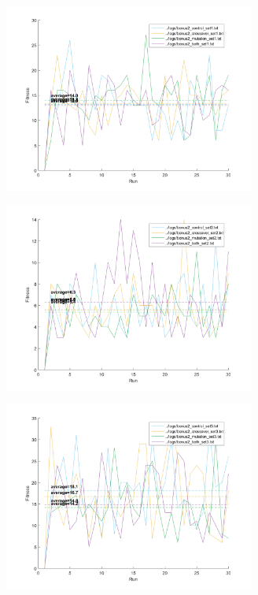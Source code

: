 \documentclass[11pt]{article}
\begin{document}
\begin{figure}[h]
\begin{minipage}{.5\textwidth}
  \includegraphics[width=3.25in]{assn1c_bonus2_set1.png}
  \label{fig:bonus2_1}
\end{minipage}%
\begin{minipage}{.5\textwidth}
\centering
  \includegraphics[width=3.25in]{assn1c_bonus2_set2.png}
  \label{fig:bonus2_2}
\end{minipage}
\end{figure}
\begin{figure}[h]
	\centering
  \includegraphics[width=3.25in]{assn1c_bonus2_set3.png}
  \label{fig:bonus2_3}
\end{figure}
\end{document}

